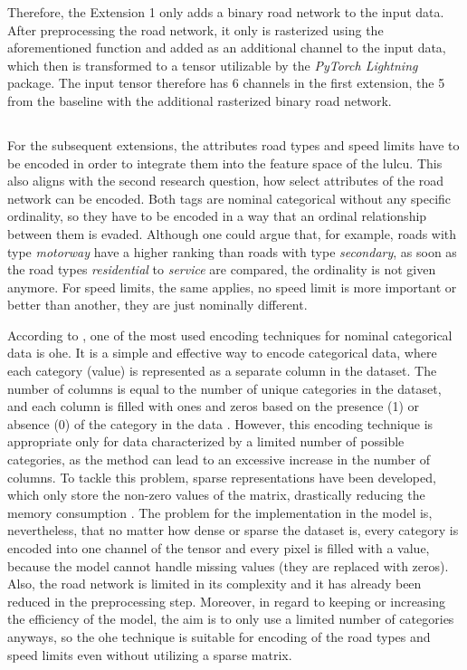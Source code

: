 Therefore, the Extension 1 only adds a binary road network to the input data. After preprocessing the road network, it only is rasterized using the aforementioned function and added as an additional channel to the input data, which then is transformed to a tensor utilizable by the \emph{PyTorch Lightning} package. The input tensor therefore has 6 channels in the first extension, the 5 from the baseline with the additional rasterized binary road network.

\subsection{}

For the subsequent extensions, the attributes road types and speed limits have to be encoded in order to integrate them into the feature space of the \gls{lulcu}. This also aligns with the second research question, how select attributes of the road network can be encoded. Both tags are nominal categorical without any specific ordinality, so they have to be encoded in a way that an ordinal relationship between them is evaded. Although one could argue that, for example, roads with type \emph{motorway} have a higher ranking than roads with type \emph{secondary}, as soon as the road types \emph{residential} to \emph{service} are compared, the ordinality is not given anymore. For speed limits, the same applies, no speed limit is more important or better than another, they are just nominally different.

According to \textcite{Hancock.Khoshgoftaar2020}, one of the most used encoding techniques for nominal categorical data is \gls{ohe}. It is a simple and effective way to encode categorical data, where each category (value) is represented as a separate column in the dataset. The number of columns is equal to the number of unique categories in the dataset, and each column is filled with ones and zeros based on the presence (1) or absence (0) of the category in the data \autocite{Hancock.Khoshgoftaar2020,Potdar.Pardawala.ea2017}. However, this encoding technique is appropriate only for data characterized by a limited number of possible categories, as the method can lead to an excessive increase in the number of columns. To tackle this problem, sparse representations have been developed, which only store the non-zero values of the matrix, drastically reducing the memory consumption \autocite{Hancock.Khoshgoftaar2020}. The problem for the implementation in the model is, nevertheless, that no matter how dense or sparse the dataset is, every category is encoded into one channel of the tensor and every pixel is filled with a value, because the model cannot handle missing values (they are replaced with zeros). Also, the road network is limited in its complexity and it has already been reduced in the preprocessing step. Moreover, in regard to keeping or increasing the efficiency of the model, the aim is to only use a limited number of categories anyways, so the \gls{ohe} technique is suitable for encoding of the road types and speed limits even without utilizing a sparse matrix.

